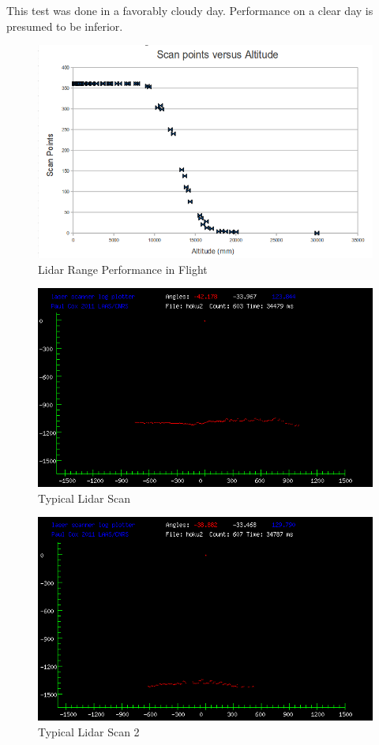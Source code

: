 \documentclass[a4paper,11pt]{report}
\begin{document}
This test was done in a favorably cloudy day. Performance on a clear day is presumed to be inferior.

\begin{figure}[ht]
 \centering
 \includegraphics[width=12cm]{scanpt_v_alt.png}
 \caption{Lidar Range Performance in Flight}
 \label{fig:lidar_perf}
\end{figure}


\begin{figure}[ht]
 \centering
 \includegraphics[width=12cm]{scan603.png}
 \caption{Typical Lidar Scan}
 \label{fig:lidar_scan1}
\end{figure}

\begin{figure}[ht]
 \centering
 \includegraphics[width=12cm]{scan607.png}
 \caption{Typical Lidar Scan 2}
 \label{fig:lidar_scan2}
\end{figure}
\end{document}
